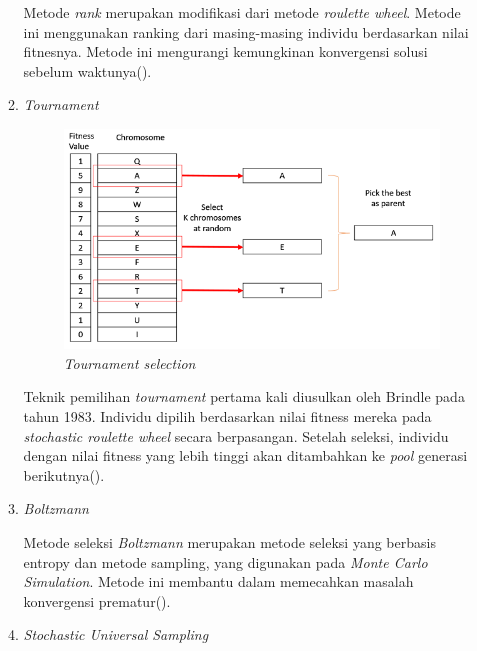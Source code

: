 \begin{enumerate}
\begin{enumerate}
    Metode \emph{rank} merupakan modifikasi dari metode \emph{roulette wheel}. Metode ini menggunakan ranking dari masing-masing individu berdasarkan nilai fitnesnya. Metode ini mengurangi kemungkinan konvergensi solusi sebelum waktunya(\cite{Katoch2020}).
    \item \emph{Tournament} 
    
    \begin{figure} [ht] \centering
      \includegraphics[scale=0.4]{gambar/tournament_selection.jpg}
      \caption{\emph{Tournament selection}}
      \label{fig:tournament}
    \end{figure}

    Teknik pemilihan \emph{tournament} pertama kali diusulkan oleh Brindle pada tahun 1983. Individu dipilih berdasarkan nilai fitness mereka pada \emph{stochastic roulette wheel} secara berpasangan. Setelah seleksi,
    individu dengan nilai fitness yang lebih tinggi akan ditambahkan ke \emph{pool} generasi berikutnya(\cite{Katoch2020}).
    \item \emph{Boltzmann} 
    
    Metode seleksi \emph{Boltzmann} merupakan metode seleksi yang berbasis entropy dan metode sampling, yang digunakan pada \emph{Monte
    Carlo Simulation}. Metode ini membantu dalam memecahkan masalah konvergensi prematur(\cite{Katoch2020}).
    \item \emph{Stochastic Universal Sampling}
    

\end{enumerate}
\end{enumerate}
